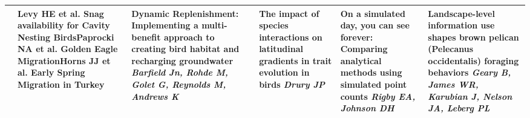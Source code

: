 \begin{tabular}{|x{0.75cm}|x{2.25cm}|a{2.25cm}|a{2.25cm}|a{2.25cm}|a{2.25cm}|x{2.25cm}|}
&\scriptsize Levy HE et al. \newline \tiny Snag availability for Cavity Nesting Birds\newline \newline \scriptsize Paprocki NA et al. \newline \tiny Golden Eagle Migration\newline \newline \scriptsize Horns JJ et al. \newline \tiny Early Spring Migration in Turkey & Dynamic Replenishment: Implementing a multi-benefit approach to creating bird habitat and recharging groundwater \newline \newline \textit{Barfield Jn, Rohde M, Golet G, Reynolds M, Andrews K} &  \newline \newline \textit{} & The impact of species interactions on latitudinal gradients in trait evolution in birds \newline \newline \textit{Drury JP} & On a simulated day, you can see forever: Comparing analytical methods using simulated point counts \newline \newline \textit{Rigby EA, Johnson DH} & Landscape-level information use shapes brown pelican (Pelecanus occidentalis) foraging behaviors \newline \newline \textit{Geary B, James WR, Karubian J, Nelson JA, Leberg PL}\\
\hline

\end{tabular}
